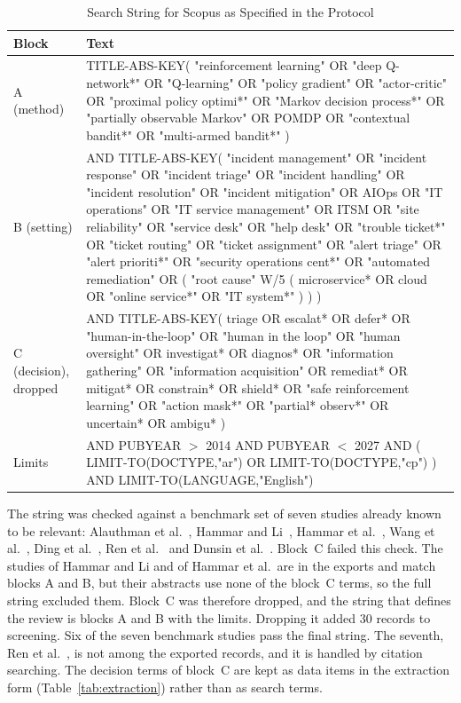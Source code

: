 \documentclass[journal]{IEEEtran}
\begin{document}
\begin{table}[!t]
\centering
\caption{Search String for Scopus as Specified in the Protocol}
\label{tab:string}
\footnotesize
\begin{tabularx}{\textwidth}{@{}lL@{}}
\toprule
Block & Text \\
\midrule
A (method) & TITLE-ABS-KEY( "reinforcement learning" OR "deep Q-network*" OR "Q-learning" OR "policy gradient" OR "actor-critic" OR "proximal policy optimi*" OR "Markov decision process*" OR "partially observable Markov" OR POMDP OR "contextual bandit*" OR "multi-armed bandit*" ) \\
B (setting) & AND TITLE-ABS-KEY( "incident management" OR "incident response" OR "incident triage" OR "incident handling" OR "incident resolution" OR "incident mitigation" OR AIOps OR "IT operations" OR "IT service management" OR ITSM OR "site reliability" OR "service desk" OR "help desk" OR "trouble ticket*" OR "ticket routing" OR "ticket assignment" OR "alert triage" OR "alert prioriti*" OR "security operations cent*" OR "automated remediation" OR ( "root cause" W/5 ( microservice* OR cloud OR "online service*" OR "IT system*" ) ) ) \\
C (decision), dropped & AND TITLE-ABS-KEY( triage OR escalat* OR defer* OR "human-in-the-loop" OR "human in the loop" OR "human oversight" OR investigat* OR diagnos* OR "information gathering" OR "information acquisition" OR remediat* OR mitigat* OR constrain* OR shield* OR "safe reinforcement learning" OR "action mask*" OR "partial* observ*" OR uncertain* OR ambigu* ) \\
Limits & AND PUBYEAR $>$ 2014 AND PUBYEAR $<$ 2027 AND ( LIMIT-TO(DOCTYPE,"ar") OR LIMIT-TO(DOCTYPE,"cp") ) AND LIMIT-TO(LANGUAGE,"English") \\
\bottomrule
\end{tabularx}
\end{table}

The string was checked against a benchmark set of seven studies already known to be relevant: Alauthman et al.~\cite{alauthman2026}, Hammar and Li~\cite{hammar2025}, Hammar et al.~\cite{hammar2026belief}, Wang et al.~\cite{wang2023hrlhf}, Ding et al.~\cite{ding2023}, Ren et al.~\cite{ren2025} and Dunsin et al.~\cite{dunsin2025}. Block~C failed this check. The studies of Hammar and Li and of Hammar et al.\ are in the exports and match blocks A and B, but their abstracts use none of the block~C terms, so the full string excluded them. Block~C was therefore dropped, and the string that defines the review is blocks A and B with the limits. Dropping it added 30 records to screening. Six of the seven benchmark studies pass the final string. The seventh, Ren et al.~\cite{ren2025}, is not among the exported records, and it is handled by citation searching. The decision terms of block~C are kept as data items in the extraction form (Table~\ref{tab:extraction}) rather than as search terms.
\end{document}
